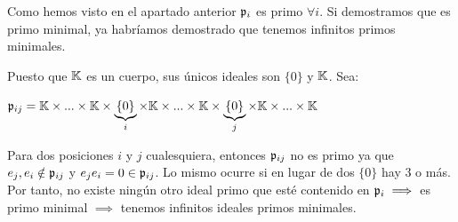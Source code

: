\begin{problem}[2]
	Como hemos visto en el apartado anterior $\mathfrak{p}_i$ es primo $\forall i$. Si demostramos que es primo minimal, ya habríamos demostrado que tenemos infinitos primos minimales.

	Puesto que $\mathbb{K}$ es un cuerpo, sus únicos ideales son $\{0\}$ y $\mathbb{K}$. Sea:

	$\mathfrak{p}_{ij} =  \mathbb{K} \times ... \times \mathbb{K} \times \underbrace{\{0\}}_{i} \times \mathbb{K} \times ... \times \mathbb{K} \times \underbrace{\{0\}}_{j} \times \mathbb{K} \times ... \times \mathbb{K}$

	Para dos posiciones $i$ y $j$ cualesquiera, entonces $\mathfrak{p}_{ij}$ no es primo ya que $e_j, e_i \notin \mathfrak{p}_{ij}$ y $e_je_i=0 \in \mathfrak{p}_{ij}$. Lo mismo ocurre si en lugar de dos $\{0\}$ hay 3 o más. Por tanto, no existe ningún otro ideal primo que esté contenido en $\mathfrak{p}_i \implies$ es primo minimal $\implies$ tenemos infinitos ideales primos minimales.
\end{problem}

